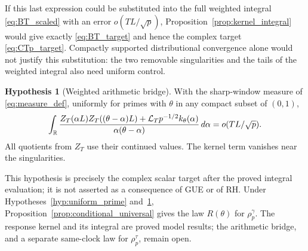 \documentclass[11pt,reqno]{amsart}
\theoremstyle{plain}\newtheorem{theorem}{Theorem}[section]\newtheorem{proposition}[theorem]{Proposition}\newtheorem{lemma}[theorem]{Lemma}\newtheorem{corollary}[theorem]{Corollary}
\theoremstyle{definition}\newtheorem{hypothesis}[theorem]{Hypothesis}\newtheorem{definition}[theorem]{Definition}
\theoremstyle{remark}\newtheorem{remark}[theorem]{Remark}\newtheorem{experiment}[theorem]{Experiment}\newtheorem{question}[theorem]{Question}\newtheorem{heuristic}[theorem]{Heuristic}\newtheorem{conjecture}[theorem]{Conjecture}
\begin{document}
If this last expression could be substituted into the full weighted integral \eqref{eq:BT_scaled} with an error $o(TL/\sqrt p)$, Proposition~\ref{prop:kernel_integral} would give exactly \eqref{eq:BT_target} and hence the complex target \eqref{eq:CTp_target}. Compactly supported distributional convergence alone would not justify this substitution: the two removable singularities and the tails of the weighted integral also need uniform control.

\begin{hypothesis}[Weighted arithmetic bridge]\label{hyp:weighted_bridge}
With the sharp-window measure of \eqref{eq:measure_def}, uniformly for primes with $\theta$ in any compact subset of $(0,1)$,
\begin{equation}
 \int_\mathbb R\frac{Z_T(\alpha L)Z_T((\theta-\alpha)L)
             +\mathcal{L}_Tp^{-1/2}k_\theta(\alpha)}
                 {\alpha(\theta-\alpha)}\,d\alpha
                         =o(TL/\sqrt p).
 \label{eq:weighted_arithmetic_bridge}
\end{equation}
All quotients from $Z_T$ use their continued values. The kernel term vanishes near the singularities.
\end{hypothesis}
This hypothesis is precisely the complex scalar target after the proved integral evaluation; it is not asserted as a consequence of GUE or of RH. Under Hypotheses~\ref{hyp:uniform_prime} and~\ref{hyp:weighted_bridge}, Proposition~\ref{prop:conditional_universal} gives the law $R(\theta)$ for $\rho_p^\gamma$. The response kernel and its integral are proved model results; the arithmetic bridge, and a separate same-clock law for $\rho_p^\tau$, remain open.
\end{document}
